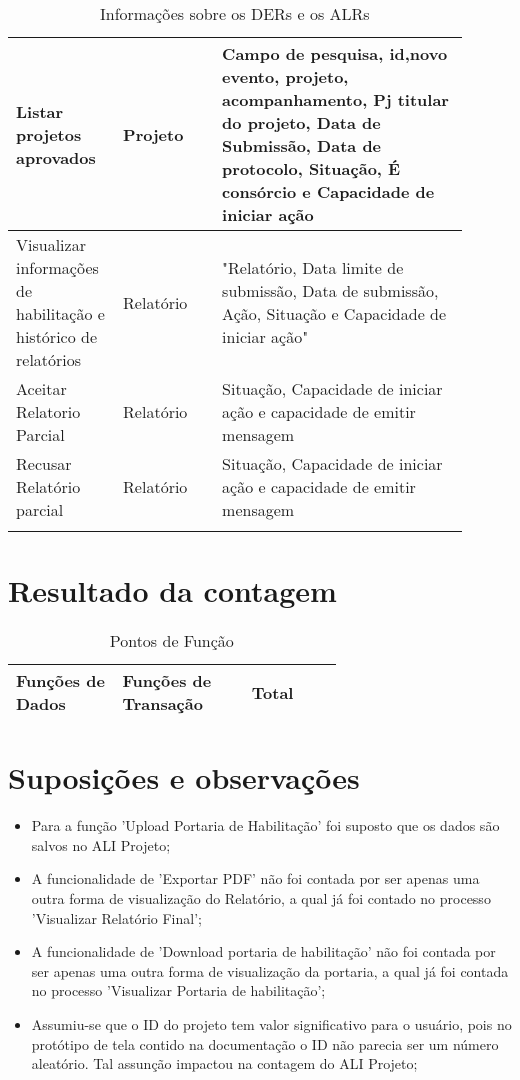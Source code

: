 \begin{longtable}{p{0.20\linewidth}p{0.20\linewidth}p{0.50\linewidth}}
    \hline
    Listar projetos aprovados&	Projeto&	Campo de pesquisa, id,novo evento,  projeto, acompanhamento, Pj titular do projeto, Data de Submissão, Data de protocolo, Situação, É consórcio e Capacidade de iniciar ação\\
    \hline
    Visualizar informações de habilitação e histórico de relatórios&	Relatório&	"Relatório, Data limite de submissão, Data de submissão, Ação, Situação e Capacidade de iniciar ação"\\

    \hline
    Aceitar Relatorio Parcial&	Relatório&	Situação, Capacidade de iniciar ação e capacidade de emitir mensagem\\

    \hline
    Recusar Relatório parcial&	Relatório&	Situação, Capacidade de iniciar ação e capacidade de emitir mensagem\\
    \hline
\caption{Informações sobre os DERs e os ALRs}
 \end{longtable}


\pagebreak
\section{Resultado da contagem}

\begin{table*}[!h]
\centering
\caption{Pontos de Função}
\label{resultado_contagem}
  \begin{tabular}{|p{0.20\linewidth}|p{0.25\linewidth}|p{0.20\linewidth}|}
  \hline
  \textbf{Funções de Dados} & \textbf{Funções de Transação} & \textbf{Total} \\ 
  \hline
 
  \end{tabular}
\end{table*}

\pagebreak
\section{Suposições e observações}

  \begin{itemize}
   \item Para a função 'Upload Portaria de Habilitação' foi suposto que os dados são salvos no ALI Projeto;
   \item A funcionalidade de 'Exportar PDF' não foi contada por ser apenas uma outra forma de visualização do Relatório, a qual já foi contado
   no processo 'Visualizar Relatório Final';
   \item A funcionalidade de 'Download portaria de habilitação' não foi contada por ser apenas uma outra forma de visualização da portaria, a qual
   já foi contada no processo 'Visualizar Portaria de habilitação';
   \item Assumiu-se que o ID do projeto tem valor significativo para o usuário, pois no protótipo de tela contido na documentação o ID não 
    parecia ser um número aleatório. Tal assunção impactou na contagem do ALI Projeto;
  \end{itemize}


